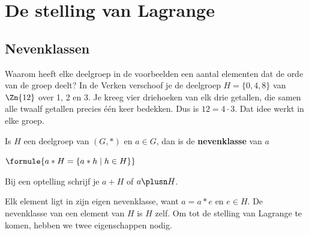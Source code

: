 \begin{oefeningen}
\end{oefeningen}

\section{De stelling van Lagrange}

\subsection{Nevenklassen}

Waarom heeft elke deelgroep in de voorbeelden een aantal elementen dat de orde van de groep deelt? In de Verken verschoof je de deelgroep $H = \{0, 4, 8\}$ van $\Zn{12}$ over 1, 2 en 3. Je kreeg vier driehoeken van elk drie getallen, die samen alle twaalf getallen precies één keer bedekken. Dus is $12 = 4 \cdot 3$. Dat idee werkt in elke groep.


\begin{theorie}
Is $H$ een deelgroep van $(G, \ast)$ en $a \in G$, dan is de \textbf{\textcolor{accent}{nevenklasse}} van $a$

\vspace{1mm}
\qquad $\formule{a \ast H = \{a \ast h \mid h \in H\}}$

\vspace{1mm}
Bij een optelling schrijf je $a + H$ of $a \plusn H$.
\end{theorie}

Elk element ligt in zijn eigen nevenklasse, want $a = a \ast e$ en $e \in H$. De nevenklasse van een element van $H$ is $H$ zelf. Om tot de stelling van Lagrange te komen, hebben we twee eigenschappen nodig.


